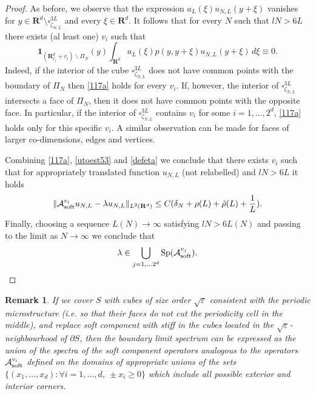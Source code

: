 \documentclass[11pt]{article}
\newcommand\e {\varepsilon}
\newcommand\soft{{\rm soft}}
\def\RR{\R}
\newcommand{\R}{\mathbf{R}}
\def\AA{\mathcal{A}}
\newtheorem{remark}[theorem]{Remark}
\theoremstyle{remark}
\begin{document}
\begin{proof}
	
	As before, we observe that the expression
	$a_L (\xi) u_{N,L}(y+\xi)$ vanishes for  $y \in \R^d \setminus\square^{3L}_{\zeta_{N,L}} $  and every $\xi \in \mathbf{R}^d$. It follows that for every $N$ such that $lN > 6L$ there exists (al least one) $v_i$ such that
	\begin{equation}\label{117a}
		\mathbf{1}_{(\mathbf{R}^d_{v_i}+v_i)\backslash \Pi_{N}} (y) \int_{\R^d}  a_L(\xi) p(y,y+\xi) u_{N,L}(y+\xi) \, d\xi \equiv 0.
	\end{equation}
	Indeed, if the interior of the cube $\square^{3L}_{\zeta_{N,L}}$ does not have common points with the boundary of $\Pi_N$ then \eqref{117a} holds for every $v_i$. If, however, the interior of  $\square^{3L}_{\zeta_{N,L}}$ intersects a face of $\Pi_N$, then it does not have common points with the opposite face. In particular, if the interior of  $\square^{3L}_{\zeta_{N,L}}$ contains $v_i$ for some $i=1,\dots,2^d$, \eqref{117a} holds only for this specific $v_i$. A similar observation can be made for faces of larger co-dimensions, edges and vertices.
	
	 Combining  \eqref{117a}, \eqref{utoest53} and \eqref{defeta} we conclude that there exists $v_i$ such that for appropriately translated function $u_{N,L}$ (not relabelled) and $lN > 6L$ it holds
	\begin{equation*} %
		\| \AA_{\soft}^{v_i} u_{N,L}-\lambda u_{N,L}\|_{L^2(\RR^d)} \leq C(\delta_{N} + \rho(L)  + \tilde\rho(L) + \frac{1}{L}).
	\end{equation*} 	
Finally, choosing a sequence $L(N)\to \infty$ satisfying $lN > 6L(N)$ and passing to the limit as $N\to \infty$ we conclude that
\begin{equation*} %
	 \lambda \in \bigcup_{j=1,\dots 2^d} \mathrm{Sp} (\AA_\soft^{v_j}).
\end{equation*}
\end{proof}


\begin{remark}
	If we cover $S$ with cubes of size order $\sqrt{\e}$ consistent with the periodic microstructure (i.e. so that their faces do not cut the periodicity cell in the middle), and replace soft component with stiff in the cubes located in the $\sqrt{\e}$-neighbourhood of $\partial S$, then the boundary limit spectrum can be expressed as the union of the spectra of the soft component operators analogous to the operators $\AA_\soft^{v_i}$ defined on the domains of appropriate unions of the sets $\{ (x_1,\dots,x_d): \forall i=1,\dots,d, \ \pm x_i \geq 0 \}$ which include all possible exterior and interior corners.
\end{remark}
\end{document}
